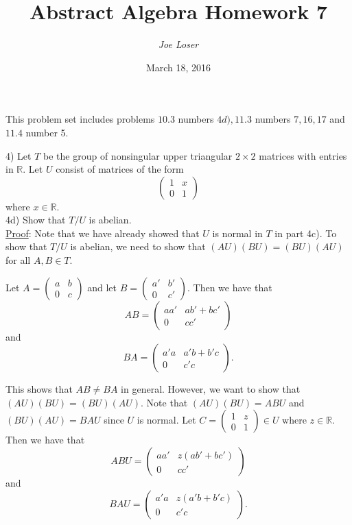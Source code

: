 \documentclass{article}
\title{Abstract Algebra Homework 7}
\author{\textit{Joe Loser}}
\date{March 18, 2016}
\begin{document}
\maketitle

This problem set includes problems $10.3$ numbers $4d), 11.3$ numbers $7, 16,17$ and $11.4$ number 5.

4) Let $T$ be the group of nonsingular upper triangular $2 \times 2$ matrices with entries in $\mathbb{R}$. Let $U$ consist of matrices of the form 
$$\begin{pmatrix}
1 & x \\
0 & 1
\end{pmatrix}$$
where $x \in \mathbb{R}$. \\

4d) Show that $T/U$ is abelian. \\

\underline{Proof}: Note that we have already showed that $U$ is normal in $T$ in part 4c). To show that $T/U$ is abelian, we need to show that $(AU)(BU) = (BU)(AU)$ for all $A, B \in T$.

Let $A =
\begin{pmatrix}
	a & b \\ 
	0 & c
\end{pmatrix}$ and let $B =
\begin{pmatrix}
	a' & b' \\
	0 & c'
\end{pmatrix}$. Then we have that $$AB = 
\begin{pmatrix}
	aa' & ab' + bc' \\
	0 & cc'
\end{pmatrix}$$ and $$BA = 
\begin{pmatrix}
	a'a & a'b + b'c \\
	0 & c'c
\end{pmatrix}.$$ 

This shows that $AB \neq BA$ in general. However, we want to show that $(AU)(BU) = (BU)(AU)$. Note that $(AU)(BU) = ABU$ and $(BU)(AU) = BAU$ since $U$ is normal. Let $C =
\begin{pmatrix}
	1 & z \\
	0 & 1
\end{pmatrix} \in U$ where $z \in \mathbb{R}$. Then we have that
$$ABU =
\begin{pmatrix}
	aa' & z(ab' + bc') \\
	0 & cc'
\end{pmatrix}$$ and 
$$BAU = 
\begin{pmatrix}
a'a & z(a'b + b'c) \\
0 & c'c
\end{pmatrix}.$$ 
\end{document}
